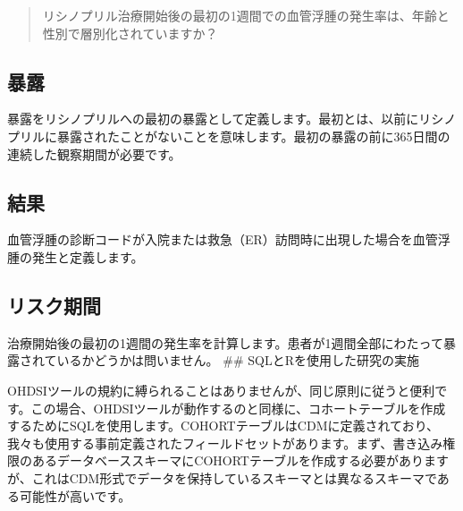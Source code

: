 \documentclass[
  11pt]{book}
\theoremstyle{definition}
\theoremstyle{definition}
\theoremstyle{definition}
\theoremstyle{definition}
\theoremstyle{remark}
\begin{document}
\begin{quote}
リシノプリル治療開始後の最初の1週間での血管浮腫の発生率は、年齢と性別で層別化されていますか？
\end{quote}

\subsection{暴露}\label{ux66b4ux9732}

暴露をリシノプリルへの最初の暴露として定義します。最初とは、以前にリシノプリルに暴露されたことがないことを意味します。最初の暴露の前に365日間の連続した観察期間が必要です。

\subsection{結果}\label{ux7d50ux679c}

血管浮腫の診断コードが入院または救急（ER）訪問時に出現した場合を血管浮腫の発生と定義します。

\subsection{リスク期間}\label{ux30eaux30b9ux30afux671fux9593}

治療開始後の最初の1週間の発生率を計算します。患者が1週間全部にわたって暴露されているかどうかは問いません。
\#\# SQLとRを使用した研究の実施

OHDSIツールの規約に縛られることはありませんが、同じ原則に従うと便利です。この場合、OHDSIツールが動作するのと同様に、コホートテーブルを作成するためにSQLを使用します。COHORTテーブルはCDMに定義されており、我々も使用する事前定義されたフィールドセットがあります。まず、書き込み権限のあるデータベーススキーマにCOHORTテーブルを作成する必要がありますが、これはCDM形式でデータを保持しているスキーマとは異なるスキーマである可能性が高いです。
\end{document}
